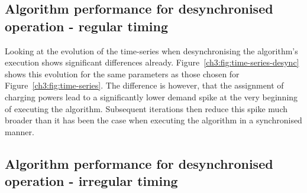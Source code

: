 \subsection{Algorithm performance for desynchronised operation - regular timing}
\label{ch3:subsec:algorithm-performance-desynchronised-regular}



Looking at the evolution of the time-series when desynchronising the algorithm's execution shows significant differences already.
Figure~\ref{ch3:fig:time-series-desync} shows this evolution for the same parameters as those chosen for Figure~\ref{ch3:fig:time-series}.
The difference is however, that the assignment of charging powers lead to a significantly lower demand spike at the very beginning of executing the algorithm.
Subsequent iterations then reduce this spike much broader than it has been the case when executing the algorithm in a synchronised manner.

\subsection{Algorithm performance for desynchronised operation - irregular timing}
\label{ch3:subsec:algorithm-performance-desynchronised-irregular}
